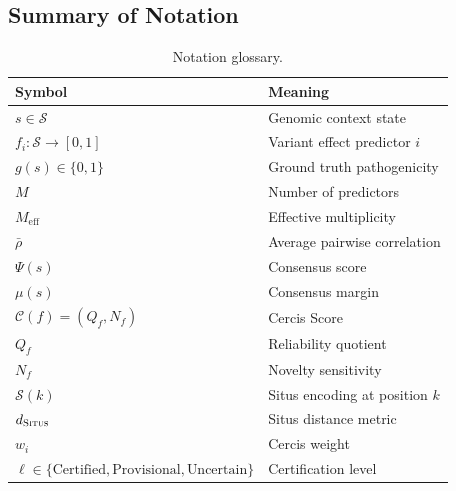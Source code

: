 \documentclass[11pt,a4paper]{article}
\theoremstyle{definition}
\newcommand{\calS}{\mathcal{S}}
\newcommand{\situs}{\textsc{Situs}}
\newcommand{\consensus}{\Psi}
\newcommand{\cercisscore}{\mathcal{C}}
\newcommand{\situsenc}{\mathcal{S}}
\begin{document}
\subsection{Summary of Notation}
\begin{table}[ht]
\centering
\caption{Notation glossary.}
\label{tab:notation}
\begin{tabular}{@{}ll@{}}
\toprule
\textbf{Symbol} & \textbf{Meaning} \\
\midrule
$s \in \calS$ & Genomic context state \\
$f_i: \calS \to [0,1]$ & Variant effect predictor $i$ \\
$g(s) \in \{0,1\}$ & Ground truth pathogenicity \\
$M$ & Number of predictors \\
$M_{\text{eff}}$ & Effective multiplicity \\
$\bar{\rho}$ & Average pairwise correlation \\
$\consensus(s)$ & Consensus score \\
$\mu(s)$ & Consensus margin \\
$\cercisscore(f) = (Q_f, N_f)$ & Cercis Score \\
$Q_f$ & Reliability quotient \\
$N_f$ & Novelty sensitivity \\
$\situsenc(k)$ & Situs encoding at position $k$ \\
$d_{\situs}$ & Situs distance metric \\
$w_i$ & Cercis weight \\
$\ell \in \{\text{Certified}, \text{Provisional}, \text{Uncertain}\}$ & Certification level \\
\bottomrule
\end{tabular}
\end{table}
\end{document}
